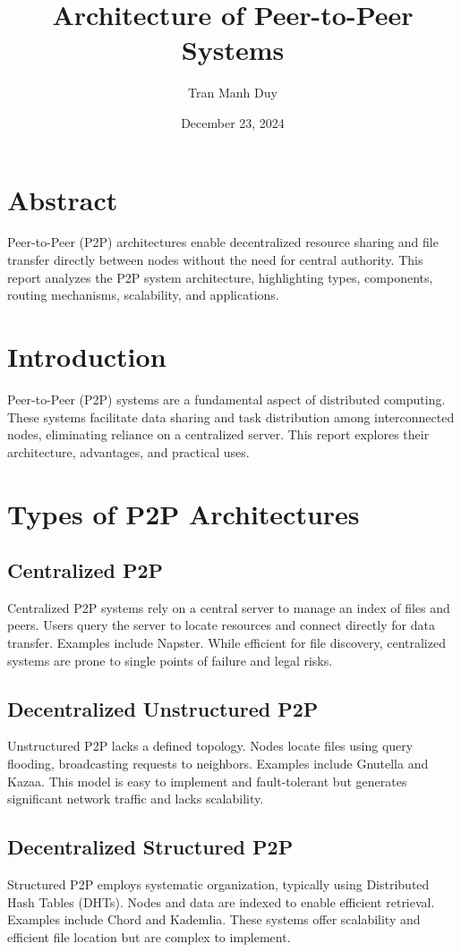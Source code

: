 \documentclass[10pt]{article}
\title{Architecture of Peer-to-Peer Systems}
\author{Tran Manh Duy}
\date{December 23, 2024}
\begin{document}
\maketitle

\tableofcontents
\newpage

\section*{Abstract}
Peer-to-Peer (P2P) architectures enable decentralized resource sharing and file transfer directly between nodes without the need for central authority. This report analyzes the P2P system architecture, highlighting types, components, routing mechanisms, scalability, and applications.

\section{Introduction}
Peer-to-Peer (P2P) systems are a fundamental aspect of distributed computing. These systems facilitate data sharing and task distribution among interconnected nodes, eliminating reliance on a centralized server. This report explores their architecture, advantages, and practical uses.

\section{Types of P2P Architectures}

\subsection{Centralized P2P}
Centralized P2P systems rely on a central server to manage an index of files and peers. Users query the server to locate resources and connect directly for data transfer. Examples include Napster. While efficient for file discovery, centralized systems are prone to single points of failure and legal risks.

\subsection{Decentralized Unstructured P2P}
Unstructured P2P lacks a defined topology. Nodes locate files using query flooding, broadcasting requests to neighbors. Examples include Gnutella and Kazaa. This model is easy to implement and fault-tolerant but generates significant network traffic and lacks scalability.

\subsection{Decentralized Structured P2P}
Structured P2P employs systematic organization, typically using Distributed Hash Tables (DHTs). Nodes and data are indexed to enable efficient retrieval. Examples include Chord and Kademlia. These systems offer scalability and efficient file location but are complex to implement.
\end{document}
